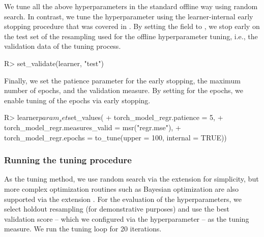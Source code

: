 \documentclass[article,shortnames]{jss}
\theoremstyle{definition}
\renewenvironment{CodeChunk}{\par\addvspace{0.6\baselineskip}\noindent\begin{minipage}{\linewidth}}{\end{minipage}\par\vspace{0.6\baselineskip}}
\begin{document}
We tune all the above hyperparameters in the standard offline way using random search.
In contrast, we tune the  hyperparameter using the learner-internal early stopping procedure that was covered in .
By setting the  field to , we stop early on the test set of the resampling used for the offline hyperparameter tuning, i.e., the validation data of the tuning process.

\begin{CodeChunk}
\begin{CodeInput}
R> set_validate(learner, "test")
\end{CodeInput}
\end{CodeChunk}

Finally, we set the patience parameter for the early stopping, the maximum number of epochs, and the validation measure.
By setting  for the epochs, we enable tuning of the epochs via early stopping.

\begin{CodeChunk}
\begin{CodeInput}
R> learner$param_set$set_values(
+    torch_model_regr.patience = 5,
+    torch_model_regr.measures_valid = msr("regr.mse"),
+    torch_model_regr.epochs = to_tune(upper = 100, internal = TRUE))
\end{CodeInput}
\end{CodeChunk}

\subsubsection{Running the tuning procedure}

As the tuning method, we use random search via the  extension \citep{ref-mlr3tuning2024} for simplicity, but more complex optimization routines such as Bayesian optimization are also supported via the  extension \citep{ref-mlr3mbo, ref-bischl2023hyperparameter}.
For the evaluation of the hyperparameters, we select holdout resampling (for demonstrative purposes) and use the best validation score -- which we configured via the  hyperparameter -- as the tuning measure.
We run the tuning loop for 20 iterations.
\end{document}
